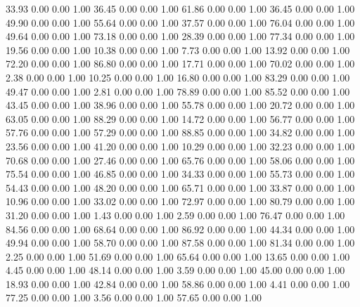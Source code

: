    33.93   0.00   0.00   1.00
   36.45   0.00   0.00   1.00
   61.86   0.00   0.00   1.00
   36.45   0.00   0.00   1.00
   49.90   0.00   0.00   1.00
   55.64   0.00   0.00   1.00
   37.57   0.00   0.00   1.00
   76.04   0.00   0.00   1.00
   49.64   0.00   0.00   1.00
   73.18   0.00   0.00   1.00
   28.39   0.00   0.00   1.00
   77.34   0.00   0.00   1.00
   19.56   0.00   0.00   1.00
   10.38   0.00   0.00   1.00
    7.73   0.00   0.00   1.00
   13.92   0.00   0.00   1.00
   72.20   0.00   0.00   1.00
   86.80   0.00   0.00   1.00
   17.71   0.00   0.00   1.00
   70.02   0.00   0.00   1.00
    2.38   0.00   0.00   1.00
   10.25   0.00   0.00   1.00
   16.80   0.00   0.00   1.00
   83.29   0.00   0.00   1.00
   49.47   0.00   0.00   1.00
    2.81   0.00   0.00   1.00
   78.89   0.00   0.00   1.00
   85.52   0.00   0.00   1.00
   43.45   0.00   0.00   1.00
   38.96   0.00   0.00   1.00
   55.78   0.00   0.00   1.00
   20.72   0.00   0.00   1.00
   63.05   0.00   0.00   1.00
   88.29   0.00   0.00   1.00
   14.72   0.00   0.00   1.00
   56.77   0.00   0.00   1.00
   57.76   0.00   0.00   1.00
   57.29   0.00   0.00   1.00
   88.85   0.00   0.00   1.00
   34.82   0.00   0.00   1.00
   23.56   0.00   0.00   1.00
   41.20   0.00   0.00   1.00
   10.29   0.00   0.00   1.00
   32.23   0.00   0.00   1.00
   70.68   0.00   0.00   1.00
   27.46   0.00   0.00   1.00
   65.76   0.00   0.00   1.00
   58.06   0.00   0.00   1.00
   75.54   0.00   0.00   1.00
   46.85   0.00   0.00   1.00
   34.33   0.00   0.00   1.00
   55.73   0.00   0.00   1.00
   54.43   0.00   0.00   1.00
   48.20   0.00   0.00   1.00
   65.71   0.00   0.00   1.00
   33.87   0.00   0.00   1.00
   10.96   0.00   0.00   1.00
   33.02   0.00   0.00   1.00
   72.97   0.00   0.00   1.00
   80.79   0.00   0.00   1.00
   31.20   0.00   0.00   1.00
    1.43   0.00   0.00   1.00
    2.59   0.00   0.00   1.00
   76.47   0.00   0.00   1.00
   84.56   0.00   0.00   1.00
   68.64   0.00   0.00   1.00
   86.92   0.00   0.00   1.00
   44.34   0.00   0.00   1.00
   49.94   0.00   0.00   1.00
   58.70   0.00   0.00   1.00
   87.58   0.00   0.00   1.00
   81.34   0.00   0.00   1.00
    2.25   0.00   0.00   1.00
   51.69   0.00   0.00   1.00
   65.64   0.00   0.00   1.00
   13.65   0.00   0.00   1.00
    4.45   0.00   0.00   1.00
   48.14   0.00   0.00   1.00
    3.59   0.00   0.00   1.00
   45.00   0.00   0.00   1.00
   18.93   0.00   0.00   1.00
   42.84   0.00   0.00   1.00
   58.86   0.00   0.00   1.00
    4.41   0.00   0.00   1.00
   77.25   0.00   0.00   1.00
    3.56   0.00   0.00   1.00
   57.65   0.00   0.00   1.00
